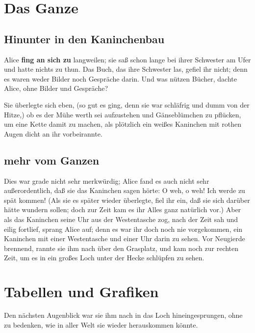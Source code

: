 \section*{Das Ganze}



\subsection*{Hinunter in den Kaninchenbau}

Alice {\bfseries fing an sich zu} langweilen; sie saß schon lange bei ihrer Schwester am
Ufer und hatte nichts zu thun. Das Buch, das ihre Schwester las, gefiel ihr
nicht; denn es waren weder Bilder noch Gespräche darin. \grqq{} Und was nützen
Bücher,\grqq{}  dachte Alice, \grqq{}ohne Bilder und Gespräche?\grqq 

Sie überlegte sich eben, (so gut es ging, denn sie war schläfrig und dumm von
der Hitze,) ob es der Mühe werth sei aufzustehen und Gänseblümchen zu pflücken,
um eine Kette damit zu machen, als plötzlich ein weißes Kaninchen mit rothen
Augen dicht an ihr vorbeirannte.

\subsection*{mehr vom Ganzen}

Dies war grade nicht sehr merkwürdig; Alice fand es auch nicht sehr
außerordentlich, daß sie das Kaninchen sagen hörte: \grqq{} O weh, o weh! Ich werde zu
spät kommen!\grqq{}  (Als sie es später wieder überlegte, fiel ihr ein, daß sie sich
darüber hätte wundern sollen; doch zur Zeit kam es ihr Alles ganz natürlich
vor.) Aber als das Kaninchen seine Uhr aus der Westentasche zog, nach der Zeit
sah und eilig fortlief, sprang Alice auf; denn es war ihr doch noch nie
vorgekommen, ein Kaninchen mit einer Westentasche und einer Uhr darin zu sehen.
Vor Neugierde brennend, rannte sie ihm nach über den Grasplatz, und kam noch
zur rechten Zeit, um es in ein großes Loch unter der Hecke schlüpfen zu sehen.




\section*{Tabellen und Grafiken}

Den nächsten Augenblick war sie ihm nach in das Loch hineingesprungen, ohne zu
bedenken, wie in aller Welt sie wieder herauskommen könnte.


